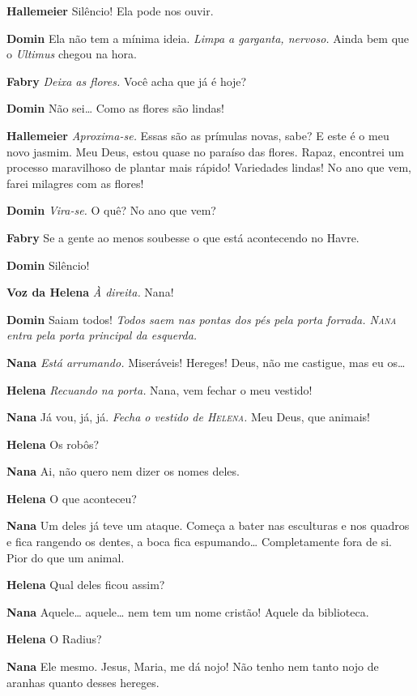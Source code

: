 \textbf{Hallemeier} Silêncio! Ela pode nos ouvir.

\textbf{Domin} Ela não tem a mínima ideia. \emph{Limpa a garganta, nervoso.} Ainda bem que o
\textit{Ultimus} chegou na hora.

\textbf{Fabry} \emph{Deixa as flores.} Você acha que já é hoje?

\textbf{Domin} Não sei\ldots{} Como as flores são lindas!

\textbf{Hallemeier} \emph{Aproxima-se.} Essas são as prímulas novas, sabe? E este é o
meu novo jasmim. Meu Deus, estou quase no paraíso das flores. Rapaz, encontrei
um processo maravilhoso de plantar mais rápido! Variedades lindas! No ano que
vem, farei milagres com as flores!

\textbf{Domin} \emph{Vira-se.} O quê? No ano que vem?

\textbf{Fabry} Se a gente ao menos soubesse o que está acontecendo no Havre.

\textbf{Domin} Silêncio!

\textbf{Voz da Helena} \emph{À direita.} Nana!

\textbf{Domin} Saiam todos! \emph{Todos saem nas pontas dos pés pela porta forrada.
\textsc{Nana} entra pela porta principal da esquerda.}

\textbf{Nana} \emph{Está arrumando.} Miseráveis! Hereges! Deus, não me
castigue, mas eu os\ldots{}

\textbf{Helena} \emph{Recuando na porta.} Nana, vem fechar o meu vestido!

\textbf{Nana} Já vou, já, já. \emph{Fecha o vestido de \textsc{Helena}.} Meu Deus, que animais!

\textbf{Helena} Os robôs?

\textbf{Nana} Ai, não quero nem dizer os nomes deles.

\textbf{Helena} O que aconteceu?

\textbf{Nana} Um deles já teve um ataque. Começa a bater nas esculturas e nos quadros e
fica rangendo os dentes, a boca fica espumando\ldots{} Completamente fora de si.
Pior do que um animal.

\textbf{Helena} Qual deles ficou assim?

\textbf{Nana} Aquele\ldots{} aquele\ldots{} nem tem um nome cristão! Aquele da biblioteca.

\textbf{Helena} O Radius?

\textbf{Nana} Ele mesmo. Jesus, Maria, me dá nojo! Não tenho nem tanto nojo de aranhas
quanto desses hereges.

